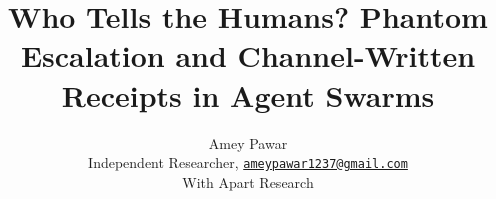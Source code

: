 \documentclass[11pt,letterpaper]{article}
\title{Who Tells the Humans? Phantom Escalation and Channel-Written Receipts in Agent Swarms}
\author{Amey Pawar\\\small Independent Researcher, \href{mailto:ameypawar1237@gmail.com}{\texttt{ameypawar1237@gmail.com}}\\\small With Apart Research}
\date{}
\begin{document}
\maketitle
\begin{abstract}

\end{abstract}













\appendix












\end{document}
